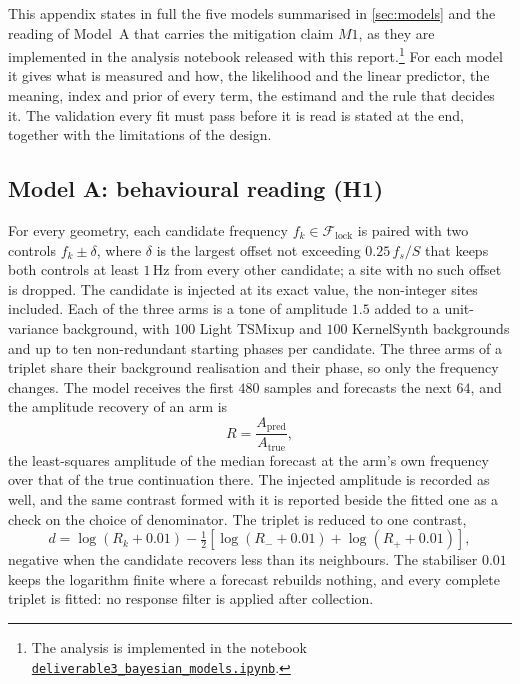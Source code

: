 This appendix states in full the five models summarised in \autoref{sec:models} and the reading of Model~A that carries the mitigation claim $M1$, as they are implemented in the analysis notebook released with this report.\footnote{The analysis is implemented in the notebook \href{https://github.com/FedericoSabbadini/patchAliasing/blob/main/notebooks/bayesian/deliverable3_bayesian_models.ipynb}{\texttt{deliverable3\_bayesian\_models.ipynb}}.} For each model it gives what is measured and how, the likelihood and the linear predictor, the meaning, index and prior of every term, the estimand and the rule that decides it. The validation every fit must pass before it is read is stated at the end, together with the limitations of the design.

\subsection{Model {A}: behavioural reading (H1)}

For every geometry, each candidate frequency $f_k\in\mathcal F_{\mathrm{lock}}$ is paired with two controls $f_k\pm\delta$, where $\delta$ is the largest offset not exceeding $0.25\,f_s/S$ that keeps both controls at least $1$\,Hz from every other candidate; a site with no such offset is dropped. The candidate is injected at its exact value, the non-integer sites included. Each of the three arms is a tone of amplitude $1.5$ added to a unit-variance background, with $100$ Light TSMixup and $100$ KernelSynth backgrounds and up to ten non-redundant starting phases per candidate. The three arms of a triplet share their background realisation and their phase, so only the frequency changes. The model receives the first $480$ samples and forecasts the next $64$, and the amplitude recovery of an arm is
\begin{equation*}
R=\frac{A_{\mathrm{pred}}}{A_{\mathrm{true}}},
\end{equation*}
the least-squares amplitude of the median forecast at the arm's own frequency over that of the true continuation there. The injected amplitude is recorded as well, and the same contrast formed with it is reported beside the fitted one as a check on the choice of denominator. The triplet is reduced to one contrast,
\begin{equation}
\label{eq:appA:contrast}
d = \log(R_k + 0.01) - \tfrac{1}{2}\left[\log(R_- + 0.01) + \log(R_+ + 0.01)\right],
\end{equation}
negative when the candidate recovers less than its neighbours. The stabiliser $0.01$ keeps the logarithm finite where a forecast rebuilds nothing, and every complete triplet is fitted: no response filter is applied after collection.

